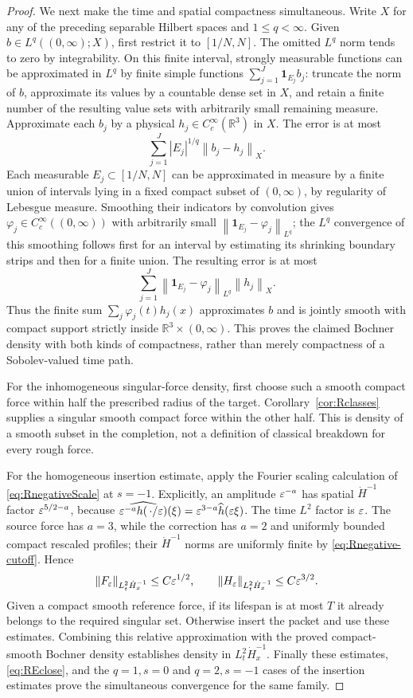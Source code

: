 \documentclass[11pt,a4paper]{article}
\theoremstyle{definition}\newtheorem{definition}[theorem]{Definition}
\theoremstyle{remark}\newtheorem{remark}[theorem]{Remark}
\newcommand{\R}{\mathbb R}\newcommand{\TT}{\mathbb T^3}
\newcommand{\norm}[1]{\left\lVert#1\right\rVert}
\begin{document}
\begin{proof}
We next make the time and spatial compactness simultaneous. Write $X$ for any of the preceding separable Hilbert spaces and $1\le q<\infty$. Given $b\in L^q((0,\infty);X)$, first restrict it to $[1/N,N]$. The omitted $L^q$ norm tends to zero by integrability. On this finite interval, strongly measurable functions can be approximated in $L^q$ by finite simple functions
$\sum_{j=1}^J\mathbf1_{E_j}b_j$: truncate the norm of $b$, approximate its values by a countable dense set in $X$, and retain a finite number of the resulting value sets with arbitrarily small remaining measure. Approximate each $b_j$ by a physical $h_j\in C_c^\infty(\R^3)$ in $X$. The error is at most
\[
 \sum_{j=1}^J |E_j|^{1/q}\norm{b_j-h_j}_X.
\]
Each measurable $E_j\subset[1/N,N]$ can be approximated in measure by a finite union of intervals lying in a fixed compact subset of $(0,\infty)$, by regularity of Lebesgue measure. Smoothing their indicators by convolution gives $\varphi_j\in C_c^\infty((0,\infty))$ with arbitrarily small $\norm{\mathbf1_{E_j}-\varphi_j}_{L^q}$; the $L^q$ convergence of this smoothing follows first for an interval by estimating its shrinking boundary strips and then for a finite union. The resulting error is at most
\[
 \sum_{j=1}^J\norm{\mathbf1_{E_j}-\varphi_j}_{L^q}\norm{h_j}_X.
\]
Thus the finite sum $\sum_j\varphi_j(t)h_j(x)$ approximates $b$ and is jointly smooth with compact support strictly inside $\R^3\times(0,\infty)$. This proves the claimed Bochner density with both kinds of compactness, rather than merely compactness of a Sobolev-valued time path.

For the inhomogeneous singular-force density, first choose such a smooth compact force within half the prescribed radius of the target. Corollary~\ref{cor:Rclasses} supplies a singular smooth compact force within the other half. This is density of a smooth subset in the completion, not a definition of classical breakdown for every rough force.

For the homogeneous insertion estimate, apply the Fourier scaling calculation of \eqref{eq:RnegativeScale} at $s=-1$. Explicitly, an amplitude $\varepsilon^{-a}$ has spatial $\dot H^{-1}$ factor $\varepsilon^{5/2-a}$, because
$\widehat{\varepsilon^{-a}h(\,\cdot/\varepsilon)}(\xi)=\varepsilon^{3-a}\widehat h(\varepsilon\xi)$.
The time $L^2$ factor is $\varepsilon$. The source force has $a=3$, while the correction has $a=2$ and uniformly bounded compact rescaled profiles; their $\dot H^{-1}$ norms are uniformly finite by \eqref{eq:Rnegative-cutoff}. Hence
\[
 \norm{F_\eps}_{L^2_t\dot H^{-1}_x}\le C\eps^{1/2},\qquad
 \norm{H_\eps}_{L^2_t\dot H^{-1}_x}\le C\eps^{3/2}.
\]
Given a compact smooth reference force, if its lifespan is at most $T$ it already belongs to the required singular set. Otherwise insert the packet and use these estimates. Combining this relative approximation with the proved compact-smooth Bochner density establishes density in $L^2_t\dot H^{-1}_x$. Finally these estimates, \eqref{eq:REclose}, and the $q=1,s=0$ and $q=2,s=-1$ cases of the insertion estimates prove the simultaneous convergence for the same family.
\end{proof}
\end{document}
